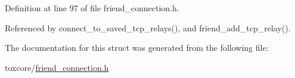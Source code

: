 Definition at line 97 of file friend\+\_\+connection.\+h.



Referenced by connect\+\_\+to\+\_\+saved\+\_\+tcp\+\_\+relays(), and friend\+\_\+add\+\_\+tcp\+\_\+relay().



The documentation for this struct was generated from the following file\+:\begin{DoxyCompactItemize}
\item 
toxcore/\hyperlink{friend__connection_8h}{friend\+\_\+connection.\+h}\end{DoxyCompactItemize}
